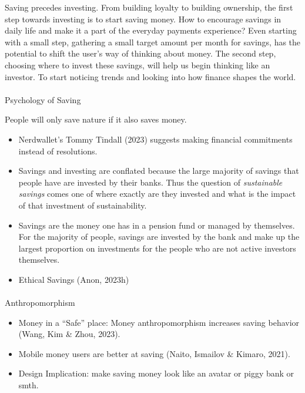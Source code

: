 \documentclass[
  letterpaper,
  DIV=11,
  numbers=noendperiod]{scrartcl}
\makeatletter
\let\oldparagraph\paragraph
\renewcommand{\paragraph}{
    \@ifstar
      \xxxParagraphStar
      \xxxParagraphNoStar
  }
\newcommand{\xxxParagraphStar}[1]{\oldparagraph*{#1}\mbox{}}
\newcommand{\xxxParagraphNoStar}[1]{\oldparagraph{#1}\mbox{}}
\makeatother
\begin{document}
Saving precedes investing. From building loyalty to building ownership,
the first step towards investing is to start saving money. How to
encourage savings in daily life and make it a part of the everyday
payments experience? Even starting with a small step, gathering a small
target amount per month for savings, has the potential to shift the
user's way of thinking about money. The second step, choosing where to
invest these savings, will help us begin thinking like an investor. To
start noticing trends and looking into how finance shapes the world.

\paragraph{Psychology of Saving}\label{psychology-of-saving}

People will only save nature if it also saves money.

\begin{itemize}
\item
  Nerdwallet's Tommy Tindall (2023) suggests making financial
  commitments instead of resolutions.
\item
  Savings and investing are conflated because the large majority of
  savings that people have are invested by their banks. Thus the
  question of \emph{sustainable savings} comes one of where exactly are
  they invested and what is the impact of that investment of
  sustainability.
\item
  Savings are the money one has in a pension fund or managed by
  themselves. For the majority of people, savings are invested by the
  bank and make up the largest proportion on investments for the people
  who are not active investors themselves.
\item
  Ethical Savings (Anon, 2023h)
\end{itemize}

\paragraph{Anthropomorphism}\label{anthropomorphism}

\begin{itemize}
\item
  Money in a ``Safe'' place: Money anthropomorphism increases saving
  behavior (Wang, Kim \& Zhou, 2023).
\item
  Mobile money users are better at saving (Naito, Ismailov \& Kimaro,
  2021).
\item
  Design Implication: make saving money look like an avatar or piggy
  bank or smth.
\end{itemize}
\end{document}

